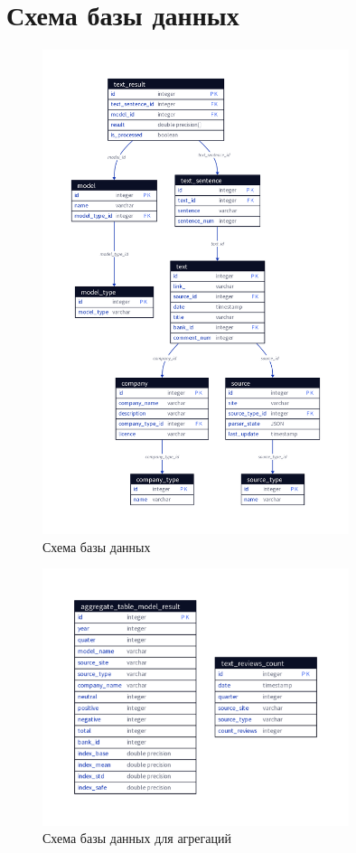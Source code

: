 \documentclass[PI, VKR]{HSEUniversity}
\begin{document}
\chapter{Схема базы данных}
\label{sec:orgf5b5eef}
\begin{figure}[h!]
\centering
\includegraphics[width=0.8\textwidth]{img/d2/database.png}
\caption{\label{fig:database}Схема базы данных}
\end{figure}

\begin{figure}[h!]
\centering
\includegraphics[width=0.8\textwidth]{img/d2/views_database.png}
\caption{\label{fig:database_views}Схема базы данных для агрегаций}
\end{figure}
\end{document}
